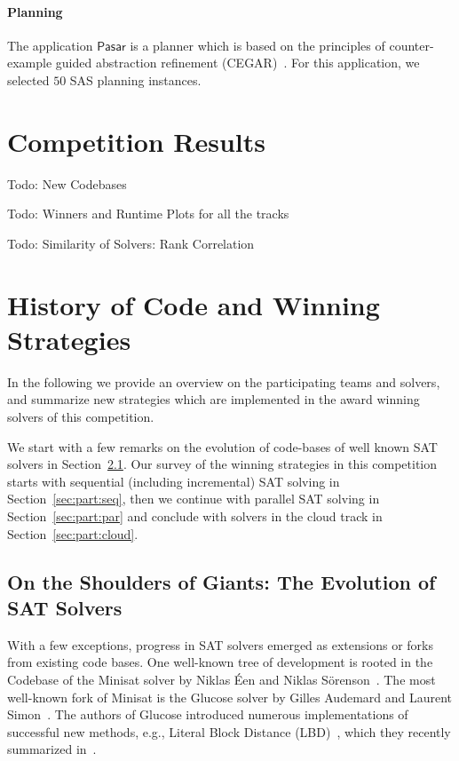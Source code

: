 \documentclass{elsarticle}
\newcommand{\todo}[1]{{\color{purple}Todo: #1}}
\begin{document}
\paragraph{Planning}
The application $\mathsf{Pasar}$ is a planner which is based on the principles of counter-example guided abstraction refinement (CEGAR)~\cite{Froleyks:2019:Pasar}. 
For this application, we selected $50$ SAS planning instances. 


\section{Competition Results}
\label{sec:results}

\todo{New Codebases}

\todo{Winners and Runtime Plots for all the tracks}

\todo{Similarity of Solvers: Rank Correlation}


\section{History of Code and Winning Strategies}
\label{sec:analysis}

In the following we provide an overview on the participating teams and solvers,  and summarize new strategies which are implemented in the award winning solvers of this competition. 

We start with a few remarks on the evolution of code-bases of well known SAT solvers in Section~\ref{sec:codebases}. 
Our survey of the winning strategies in this competition starts with sequential (including incremental) SAT solving in Section~\ref{sec:part:seq}, then we continue with parallel SAT solving in Section~\ref{sec:part:par} and conclude with solvers in the cloud track in Section~\ref{sec:part:cloud}. 


\subsection{On the Shoulders of Giants: The Evolution of SAT Solvers}
\label{sec:codebases}

With a few exceptions, progress in SAT solvers emerged as extensions or forks from existing code bases. 
One well-known tree of development is rooted in the Codebase of the Minisat solver by Niklas Éen and Niklas Sörenson~\cite{}. 
The most well-known fork of Minisat is the Glucose solver by Gilles Audemard and Laurent Simon~\cite{}.  
The authors of Glucose introduced numerous implementations of successful new methods, e.g., Literal Block Distance (LBD)~\cite{}, which they recently summarized in~\cite{}. 
\end{document}
